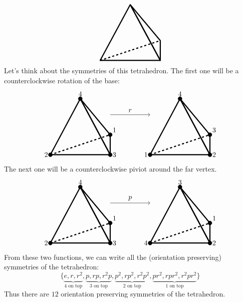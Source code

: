 \documentclass{ximera}
\begin{document}
\[
\begin{tikzpicture}
  \draw[ultra thick,rounded corners=.05mm] (0,0) -- (3,0) -- (1.5,2.8) -- cycle;
  \draw[ultra thick,rounded corners=.05mm] (3,1) -- (3,0) -- (1.5,2.8) -- cycle;
  \draw[ultra thick,dashed] (0,0) -- (3,1);
\end{tikzpicture}
\]
Let's think about the symmetries of this tetrahedron. The first one
will be a counterclockwise rotation of the base:
\[
\begin{tikzpicture}
  \draw[ultra thick,rounded corners=.05mm] (0,0) -- (3,0) -- (1.5,2.8) -- cycle;
  \draw[ultra thick,rounded corners=.05mm] (3,1) -- (3,0) -- (1.5,2.8) -- cycle;
  \draw[ultra thick,dashed] (0,0) -- (3,1);
  \draw[fill] (3,1) circle (1mm) node[above right] {$1$};
  \draw[fill] (0,0) circle (1mm) node[left] {$2$};
  \draw[fill] (3,0) circle (1mm) node[right] {$3$};
  \draw[fill] (1.5,2.8) circle (1mm) node[above] {$4$};

  \draw[->] (3,2) -- (5,2);
  \node[above] at (4,2) {$r$};
  
  \draw[ultra thick,rounded corners=.05mm] (5,0) -- (8,0) -- (6.5,2.8) -- cycle;
  \draw[ultra thick,rounded corners=.05mm] (8,1) -- (8,0) -- (6.5,2.8) -- cycle;
  \draw[ultra thick,dashed] (5,0) -- (8,1);
  \draw[fill] (8,1) circle (1mm) node[above right] {$3$};
  \draw[fill] (5,0) circle (1mm) node[left] {$1$};
  \draw[fill] (8,0) circle (1mm) node[right] {$2$};
  \draw[fill] (6.5,2.8) circle (1mm) node[above] {$4$};
\end{tikzpicture}
\]
The next one will be a counterclockwise piviot around the far vertex. 
\[
\begin{tikzpicture}
  \draw[ultra thick,rounded corners=.05mm] (0,0) -- (3,0) -- (1.5,2.8) -- cycle;
  \draw[ultra thick,rounded corners=.05mm] (3,1) -- (3,0) -- (1.5,2.8) -- cycle;
  \draw[ultra thick,dashed] (0,0) -- (3,1);
  \draw[fill] (3,1) circle (1mm) node[above right] {$1$};
  \draw[fill] (0,0) circle (1mm) node[left] {$2$};
  \draw[fill] (3,0) circle (1mm) node[right] {$3$};
  \draw[fill] (1.5,2.8) circle (1mm) node[above] {$4$};

  \draw[->] (3,2) -- (5,2);
  \node[above] at (4,2) {$p$};
  
  \draw[ultra thick,rounded corners=.05mm] (5,0) -- (8,0) -- (6.5,2.8) -- cycle;
  \draw[ultra thick,rounded corners=.05mm] (8,1) -- (8,0) -- (6.5,2.8) -- cycle;
  \draw[ultra thick,dashed] (5,0) -- (8,1);
  \draw[fill] (8,1) circle (1mm) node[above right] {$1$};
  \draw[fill] (5,0) circle (1mm) node[left] {$4$};
  \draw[fill] (8,0) circle (1mm) node[right] {$2$};
  \draw[fill] (6.5,2.8) circle (1mm) node[above] {$3$};
\end{tikzpicture}
\]
From these two functions, we can write all the (orientation
preserving) symmetries of the tetrahedron:
\[
\{\underbrace{e,r,r^2}_{\text{$4$ on top}}, \underbrace{p,rp,r^2p}_{\text{$3$ on top}}, \underbrace{p^2,rp^2,r^2p^2}_{\text{$2$ on top}},\underbrace{pr^2,rpr^2,r^2pr^2}_{\text{$1$ on top}}\}
\]
Thus there are $12$ orientation preserving symmetries of the
tetrahedron.
\end{document}
